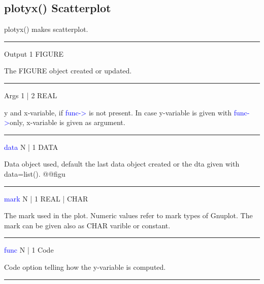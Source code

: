 \subsection{\textcolor{VioletRed}{plotyx}() Scatterplot}
\label{plotyx}
\textcolor{VioletRed}{plotyx}() makes scatterplot.
\vspace{0.3cm}
\hrule
\vspace{0.3cm}
\noindent Output  \tabto{3cm}  1 \tabto{5cm}   FIGURE  \tabto{7cm}
\begin{changemargin}{3cm}{0cm}
\noindent  The FIGURE object created or updated.
\end{changemargin}
\vspace{0.3cm}
\hrule
\vspace{0.3cm}
\noindent Args  \tabto{3cm}  1 | 2  \tabto{5cm}   REAL  \tabto{7cm}
\begin{changemargin}{3cm}{0cm}
\noindent  y and x-variable, if \textcolor{blue}{func->} is not present.
In case y-variable is given with \textcolor{blue}{func->}only,  x-variable is given as argument.
\end{changemargin}
\vspace{0.3cm}
\hrule
\vspace{0.3cm}
\noindent \textcolor{blue}{data}  \tabto{3cm}  N | 1  \tabto{5cm}   DATA  \tabto{7cm}
\begin{changemargin}{3cm}{0cm}
\noindent  Data object used, default the last data object created or the dta given
with data=\textcolor{VioletRed}{list}().
@@figu
\end{changemargin}
\vspace{0.3cm}
\hrule
\vspace{0.3cm}
\noindent \textcolor{blue}{mark}  \tabto{3cm}  N | 1  \tabto{5cm}   REAL | CHAR  \tabto{7cm}
\begin{changemargin}{3cm}{0cm}
\noindent  The mark used in the plot. Numeric values refer to
mark types of Gnuplot. The mark can be given also as CHAR varible or constant.
\end{changemargin}
\vspace{0.3cm}
\hrule
\vspace{0.3cm}
\noindent \textcolor{blue}{func} \tabto{3cm}  N | 1  \tabto{5cm}   Code  \tabto{7cm}
\begin{changemargin}{3cm}{0cm}
\noindent   Code option telling how the y-variable is computed.
\end {changemargin}
\hrule
\vspace{0.2cm}
